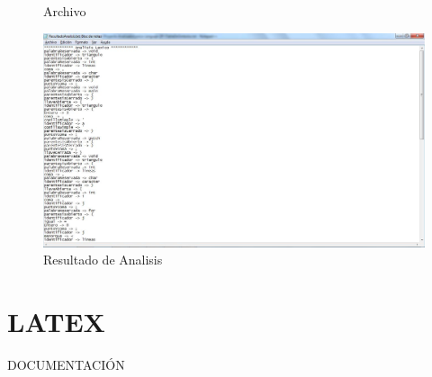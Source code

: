 \documentclass[10pt,oneside]{report}
\begin{document}
{\begin{figure}[t]
	\caption{Archivo}
	\includegraphics[width=.80\textwidth]{./imagenes/haskell3.jpg}
	\caption{Resultado de Analisis}
\end{figure}
}

\chapter{LATEX} DOCUMENTACIÓN \newline
\end{document}
